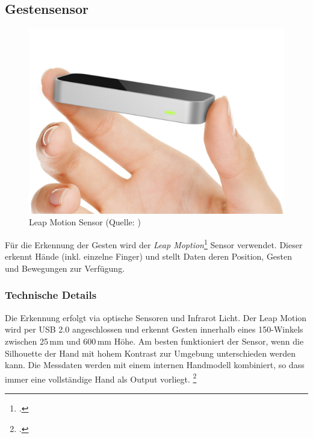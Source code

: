 \subsection{Gestensensor} \label{subsec:leapmotion}
\begin{figure}
	\includegraphics[width=1.0\linewidth]{images/analysis/leap_simple.png}
	\caption[Leap Motion Sensor]{Leap Motion Sensor (Quelle: )}
\end{figure}

Für die Erkennung der Gesten wird der \textit{Leap Moption}\footcite{Leap_Motion_Motion_Controller_2015-03-27} Sensor verwendet.
Dieser erkennt Hände (inkl. einzelne Finger) und stellt Daten deren Position, Gesten und Bewegungen zur Verfügung.

\subsubsection{Technische Details}
Die Erkennung erfolgt via optische Sensoren und Infrarot Licht.
Der Leap Motion wird per USB 2.0 angeschlossen und erkennt Gesten innerhalb eines 150\textdegree-Winkels zwischen 25\,mm und 600\,mm Höhe.
Am besten funktioniert der Sensor, wenn die Silhouette der Hand mit hohem Kontrast zur Umgebung unterschieden werden kann.
Die Messdaten werden mit einem internen Handmodell kombiniert, so dass immer eine vollständige Hand als Output vorliegt.
\footcite{API_Overview__Leap_Motion_v2.2_documentation_2015-03-27}


